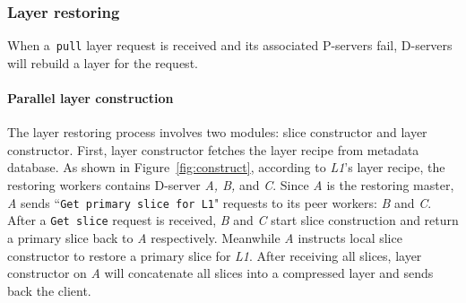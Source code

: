 \subsubsection{Layer restoring}
\label{sec:restore-desgin}



When a~\texttt{pull} layer request is received and its associated 
P-servers fail, D-servers will rebuild a layer for the request.


\paragraph{Parallel layer construction}

The layer restoring process involves two modules: slice constructor and layer constructor. 
First, 
layer constructor fetches the layer recipe from metadata database.
As shown in Figure~\ref{fig:construct}, according to \emph{L1}'s layer recipe, 
the restoring workers contains D-server \emph{A, B,} and \emph{C}.
Since \emph{A} is the restoring master,
\emph{A} sends ``\texttt{Get primary slice for L1}" requests to its peer workers: \emph{B} and \emph{C}.
After a \texttt{Get slice} request is received, 
\emph{B} and \emph{C} start slice construction and return a primary slice back to \emph{A} respectively.
Meanwhile \emph{A} instructs local slice constructor to restore a primary slice for \emph{L1}.
After receiving all slices, layer constructor on \emph{A} will concatenate all slices into a compressed layer
and sends back the client. 

